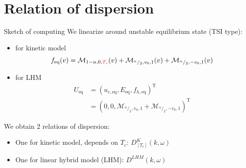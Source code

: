 \documentclass{beamer}
\begin{document}
\section{Relation of dispersion}
\begin{frame}{Sketch of computing}
  We linearize around unstable equilibrium state (TSI type):
  \begin{itemize}
    \item for kinetic model $$f_\text{eq}(v) = \mathcal{M}_{1-\alpha,0,{\color{red}T_c}}(v) + \mathcal{M}_{^\alpha/_2,v_0,1}(v) + \mathcal{M}_{^\alpha/_2,-v_0,1}(v)$$
    \item for LHM $$
      \begin{aligned}
        U_\text{eq} &= \left(u_{c,\text{eq}},E_\text{eq},f_{h,\text{eq}}\right)^\text{T} \\
                    &= \left(0,0, \mathcal{M}_{^\alpha/_2,v_0,1} + \mathcal{M}_{^\alpha/_2,-v_0,1}\right)^\text{T}
      \end{aligned}
    $$
  \end{itemize}

  We obtain 2 relations of dispersion:
  \begin{itemize}
    \item One for kinetic model, depends on $T_c$: $D^K_{[T_c]}(k,\omega)$
    \item One for linear hybrid model (LHM): $D^{LHM}(k,\omega)$
  \end{itemize}
\end{frame}
\end{document}
